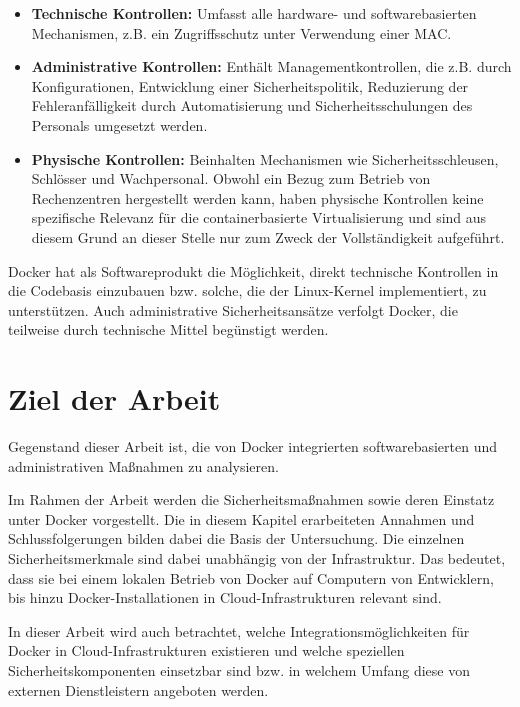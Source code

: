 \documentclass[../main.tex]{subfiles}
\begin{document}
    \begin{itemize}
      \item \textbf{Technische Kontrollen:} Umfasst alle hardware- und softwarebasierten Mechanismen, z.B. ein Zugriffsschutz unter Verwendung einer \acrshort{MAC}.
      \item \textbf{Administrative Kontrollen:} Enthält Managementkontrollen, die z.B. durch Konfigurationen, Entwicklung einer Sicherheitspolitik, Reduzierung der Fehleranfälligkeit durch Automatisierung und Sicherheitsschulungen des Personals umgesetzt werden.
      \item \textbf{Physische Kontrollen:} Beinhalten Mechanismen wie Sicherheitsschleusen, Schlösser und Wachpersonal. Obwohl ein Bezug zum Betrieb von Rechenzentren hergestellt werden kann, haben physische Kontrollen keine spezifische Relevanz für die containerbasierte Virtualisierung und sind aus diesem Grund an dieser Stelle nur zum Zweck der Vollständigkeit aufgeführt.
    \end{itemize}

    Docker hat als Softwareprodukt die Möglichkeit, direkt technische Kontrollen in die Codebasis einzubauen bzw. solche, die der Linux-Kernel implementiert, zu unterstützen. Auch administrative Sicherheitsansätze verfolgt Docker, die teilweise durch technische Mittel begünstigt werden.

  \section{Ziel der Arbeit}
    Gegenstand dieser Arbeit ist, die von Docker integrierten softwarebasierten und administrativen Maßnahmen zu analysieren.

    Im Rahmen der Arbeit werden die Sicherheitsmaßnahmen sowie deren Einstatz unter Docker vorgestellt. Die in diesem Kapitel erarbeiteten Annahmen und Schlussfolgerungen bilden dabei die Basis der Untersuchung. Die einzelnen Sicherheitsmerkmale sind dabei unabhängig von der Infrastruktur. Das bedeutet, dass sie bei einem lokalen Betrieb von Docker auf Computern von Entwicklern, bis hinzu Docker-Installationen in Cloud-Infrastrukturen relevant sind.

    In dieser Arbeit wird auch betrachtet, welche Integrationsmöglichkeiten für Docker in Cloud-Infrastrukturen existieren und welche speziellen Sicherheitskomponenten einsetzbar sind bzw. in welchem Umfang diese von externen Dienstleistern angeboten werden.

\end{document}

